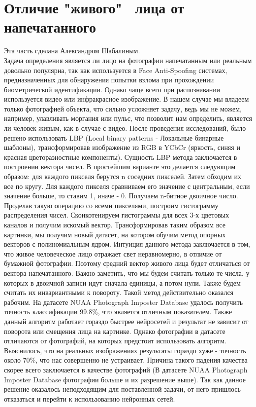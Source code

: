 \documentclass[a4paper,14pt]{extarticle}
\begin{document}
    \section{Отличие "живого" \, лица от напечатанного}
    Эта часть сделана Александром Шабалиным.\\
    Задача определения является ли лицо на фотографии напечатанным или реальным довольно популярна, так как используется в Face Anti-Spoofing системах, предназначенных для обнаружения попытки взлома при прохождении биометрической идентификации. Однако чаще всего при распознавании используется видео или инфракрасное изображение. В нашем случае мы владеем только фотографией объекта, что сильно усложняет задачу, ведь мы не можем, например, улавливать моргания или пульс, что позволит нам определить, является ли человек живым, как в случае с видео.
    После проведения исследований, было решено использовать LBP (Local binary patterns - Локальные бинарные шаблоны), трансформировав изображение из RGB в YCbCr (яркость, синяя и красная цветоразностные компоненты). Сущность LBP метода заключается в построении вектора чисел. В простейшим варианте это делается следующим образом: для каждого пикселя берутся n соседних пикселей. Затем обходим их все по кругу. Для каждого пикселя сравниваем его значение с центральным, если значение больше, то ставим 1, иначе - 0. Получаем n-битное двоичное число. Проделав такую операцию со всеми пикселями, построим гистограмму распределения чисел. Сконкотенируем гистограммы для всех 3-х цветовых каналов и получим искомый вектор. Трансформировав таким образом все картинки, мы получим новый датасет, на котором обучим метод опорных векторов с полиномиальным ядром.
    Интуиция данного метода заключается в том, что живое человеческое лицо отражает свет неравномерно, в отличие от бумажной фотографии. Поэтому средний вектор живого лица будет отличаться от вектора напечатанного. Важно заметить, что мы будем считать только те числа, у которых в двоичной записи идут сначала единицы, а потом нули. Также будем считать их инвариантными к повороту.
    Такой метод действительно оказался рабочим. На датасете NUAA Photograph Imposter Database удалось получить точность классификации 99.8\%, что является отличным показателем. Также данный алгоритм работает гораздо быстрее нейросетей и результат не зависит от поворота или смещения лица на картинке. Однако фотографии в датасете отличаются от фотографий, на которых предстоит использовать алгоритм. Выяснилось, что на реальных изображениях результаты гораздо хуже - точность около 70\%, что нас совершенно не устраивает. Причина такого падения качества скорее всего заключается в качестве фотографий (В датасете NUAA Photograph Imposter Database фотографии больше и их разрешение выше). Так как данное решение оказалось неподходящим для поставленной задачи, от него пришлось отказаться и перейти к использованию нейронных сетей.
    \newpage
\end{document}
